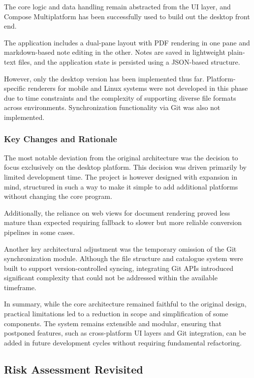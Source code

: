 The core logic and data handling remain abstracted from the UI layer, and Compose Multiplatform has been successfully used to build out the desktop front end. 

The application includes a dual-pane layout with PDF rendering in one pane and markdown-based note editing in the other. Notes are saved in lightweight plain-text files, and the application state is persisted using a JSON-based structure.

However, only the desktop version has been implemented thus far. Platform-specific renderers for mobile and Linux systems were not developed in this phase due to time constraints and the complexity of supporting diverse file formats across environments. Synchronization functionality via Git was also not implemented. 


\subsubsection{Key Changes and Rationale}

The most notable deviation from the original architecture was the decision to focus exclusively on the desktop platform. This decision was driven primarily by limited development time. The project is however designed with expansion in mind, structured in such a way to make it simple to add additional platforms without changing the core program. 

Additionally, the reliance on web views for document rendering proved less mature than expected requiring fallback to slower but more reliable conversion pipelines in some cases.

Another key architectural adjustment was the temporary omission of the Git synchronization module. Although the file structure and catalogue system were built to support version-controlled syncing, integrating Git APIs introduced significant complexity that could not be addressed within the available timeframe.

In summary, while the core architecture remained faithful to the original design, practical limitations led to a reduction in scope and simplification of some components. The system remains extensible and modular, ensuring that postponed features, such as cross-platform UI layers and Git integration, can be added in future development cycles without requiring fundamental refactoring.


\subsection{Risk Assessment Revisited}
